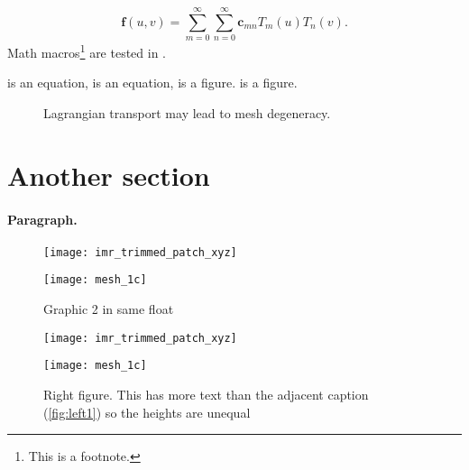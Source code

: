 \begin{equation}
	\boldsymbol{f}(u,v) = \sum_{m = 0}^\infty \sum_{n = 0}^\infty \boldsymbol{c}_{mn} T_m(u) T_n(v) .
\end{equation}
Math macros\footnote{This is a footnote.} are tested in .
\lipsum


 is an equation,  is an equation,  is a figure.  is a figure.

\begin{figure}
\centering
\caption{Lagrangian transport may lead to mesh degeneracy.}
\label{fig0}
\end{figure}


\section{Another section}
\paragraph{Paragraph.}
\lipsum[1-7]

\begin{figure}
  \centering
  \begin{minipage}{0.4\textwidth}
    \centering
    \texttt{[image: imr\_trimmed\_patch\_xyz]}
    \caption{Graphic 1 in a float} \label{fig:mult2}
  \end{minipage}
  \hfill
  \begin{minipage}{0.4\textwidth}
    \centering
    \texttt{[image: mesh\_1c]}
    \caption{Graphic 2 in same float} \label{fig:mult3}
  \end{minipage}
\end{figure}

\lipsum[8-15]

\begin{figure}
  \vspace{\onelineskip}
  \null\hfill\parbox{0.48\linewidth}{%
    \centering
    \texttt{[image: imr\_trimmed\_patch\_xyz]}
  }\hfill
  \parbox{0.48\linewidth}{%
    \centering
	\texttt{[image: mesh\_1c]}
  }\hfill\null
  \vspace{\onelineskip}%
  \null\hfill\parbox[t]{0.48\linewidth}{%
  	\caption{Left figure}\label{fig:left1}%
  }\hfill
  \parbox[t]{0.48\linewidth}{%
    \caption{Right figure. This has more text than the adjacent
    caption (\ref{fig:left1}) so the heights are unequal}%
  	\label{fig:right1}%
  }\hfill\null
\end{figure}




